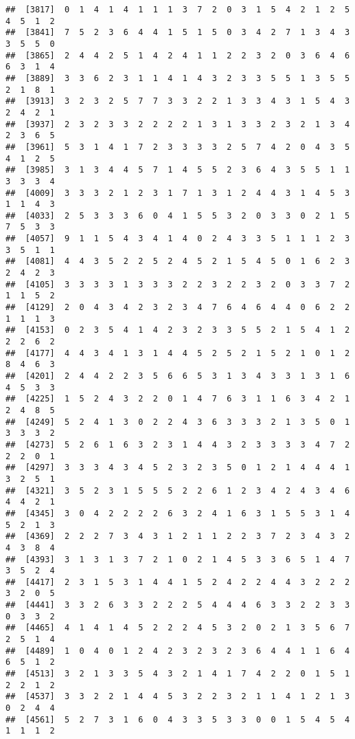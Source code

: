 \documentclass[
]{article}
\begin{document}
\begin{verbatim}
##  [3817]  0  1  4  1  4  1  1  1  3  7  2  0  3  1  5  4  2  1  2  5  4  5  1  2
##  [3841]  7  5  2  3  6  4  4  1  5  1  5  0  3  4  2  7  1  3  4  3  3  5  5  0
##  [3865]  2  4  4  2  5  1  4  2  4  1  1  2  2  3  2  0  3  6  4  6  6  3  1  4
##  [3889]  3  3  6  2  3  1  1  4  1  4  3  2  3  3  5  5  1  3  5  5  2  1  8  1
##  [3913]  3  2  3  2  5  7  7  3  3  2  2  1  3  3  4  3  1  5  4  3  2  4  2  1
##  [3937]  2  3  2  3  3  2  2  2  2  1  3  1  3  3  2  3  2  1  3  4  2  3  6  5
##  [3961]  5  3  1  4  1  7  2  3  3  3  3  2  5  7  4  2  0  4  3  5  4  1  2  5
##  [3985]  3  1  3  4  4  5  7  1  4  5  5  2  3  6  4  3  5  5  1  1  3  3  3  4
##  [4009]  3  3  3  2  1  2  3  1  7  1  3  1  2  4  4  3  1  4  5  3  1  1  4  3
##  [4033]  2  5  3  3  3  6  0  4  1  5  5  3  2  0  3  3  0  2  1  5  7  5  3  3
##  [4057]  9  1  1  5  4  3  4  1  4  0  2  4  3  3  5  1  1  1  2  3  3  5  1  1
##  [4081]  4  4  3  5  2  2  5  2  4  5  2  1  5  4  5  0  1  6  2  3  2  4  2  3
##  [4105]  3  3  3  3  1  3  3  3  2  2  3  2  2  3  2  0  3  3  7  2  1  1  5  2
##  [4129]  2  0  4  3  4  2  3  2  3  4  7  6  4  6  4  4  0  6  2  2  1  1  1  3
##  [4153]  0  2  3  5  4  1  4  2  3  2  3  3  5  5  2  1  5  4  1  2  2  2  6  2
##  [4177]  4  4  3  4  1  3  1  4  4  5  2  5  2  1  5  2  1  0  1  2  8  4  6  3
##  [4201]  2  4  4  2  2  3  5  6  6  5  3  1  3  4  3  3  1  3  1  6  4  5  3  3
##  [4225]  1  5  2  4  3  2  2  0  1  4  7  6  3  1  1  6  3  4  2  1  2  4  8  5
##  [4249]  5  2  4  1  3  0  2  2  4  3  6  3  3  3  2  1  3  5  0  1  3  3  3  2
##  [4273]  5  2  6  1  6  3  2  3  1  4  4  3  2  3  3  3  3  4  7  2  2  2  0  1
##  [4297]  3  3  3  4  3  4  5  2  3  2  3  5  0  1  2  1  4  4  4  1  3  2  5  1
##  [4321]  3  5  2  3  1  5  5  5  2  2  6  1  2  3  4  2  4  3  4  6  4  4  2  1
##  [4345]  3  0  4  2  2  2  2  6  3  2  4  1  6  3  1  5  5  3  1  4  5  2  1  3
##  [4369]  2  2  2  7  3  4  3  1  2  1  1  2  2  3  7  2  3  4  3  2  4  3  8  4
##  [4393]  3  1  3  1  3  7  2  1  0  2  1  4  5  3  3  6  5  1  4  7  3  5  2  4
##  [4417]  2  3  1  5  3  1  4  4  1  5  2  4  2  2  4  4  3  2  2  2  3  2  0  5
##  [4441]  3  3  2  6  3  3  2  2  2  5  4  4  4  6  3  3  2  2  3  3  0  3  3  2
##  [4465]  4  1  4  1  4  5  2  2  2  4  5  3  2  0  2  1  3  5  6  7  2  5  1  4
##  [4489]  1  0  4  0  1  2  4  2  3  2  3  2  3  6  4  4  1  1  6  4  6  5  1  2
##  [4513]  3  2  1  3  3  5  4  3  2  1  4  1  7  4  2  2  0  1  5  1  2  2  1  2
##  [4537]  3  3  2  2  1  4  4  5  3  2  2  3  2  1  1  4  1  2  1  3  0  2  4  4
##  [4561]  5  2  7  3  1  6  0  4  3  3  5  3  3  0  0  1  5  4  5  4  1  1  1  2

\end{verbatim}
\end{document}
